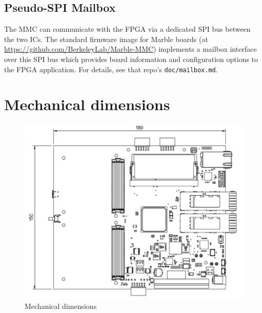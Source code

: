 \documentclass[12pt,oneside,a4]{article}
\begin{document}
\subsection{Pseudo-SPI Mailbox}\label{sec:MMC:Mailbox}
  The MMC can communicate with the FPGA via a dedicated SPI bus between the two ICs.
  The standard firmware image for Marble boards (at \url{https://github.com/BerkeleyLab/Marble-MMC}) implements a mailbox
  interface over this SPI bus which provides board information and configuration options to the FPGA application.
  For details, see that repo's {\tt doc/mailbox.md}.

\section{Mechanical dimensions}

\begin{figure}[H]
\begin{center}
\includegraphics[width=1\linewidth]{mechanical.png}
 \caption{Mechanical dimensions}\label{mechanical}
\end{center}
\end{figure}
\end{document}
